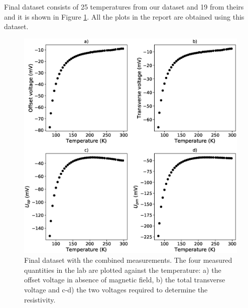 \documentclass[11pt,a4paper]{article}
\begin{document}
\begin{appendices}
Final dataset consists of 25 temperatures from our dataset and 19 from theirs and it is shown in Figure \ref{fig:final_dataset}. All the plots in the report are obtained using this dataset.

\begin{figure}[H]
\centering
\includegraphics[width=\textwidth]{final_dataset.eps}
\caption{Final dataset with the combined measurements. The four measured quantities in the lab are plotted against the temperature: a) the offset voltage in absence of magnetic field, b) the total transverse voltage and c-d) the two voltages required to determine the resistivity.}
\label{fig:final_dataset}
\end{figure}

\end{appendices}
\end{document}
